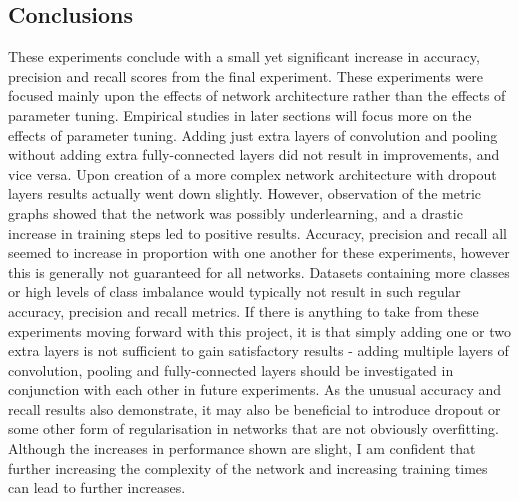 \documentclass[12pt]{report}
\begin{document}
\begin{flushleft}
\vspace{0.5cm}
\section{Conclusions}
These experiments conclude with a small yet significant increase in accuracy, precision and recall scores from the final experiment. These experiments were focused mainly upon the effects of network architecture rather than the effects of parameter tuning. Empirical studies in later sections will focus more on the effects of parameter tuning. Adding just extra layers of convolution and pooling without adding extra fully-connected layers did not result in improvements, and vice versa. Upon creation of a more complex network architecture with dropout layers results actually went down slightly. However, observation of the metric graphs showed that the network was possibly underlearning, and a drastic increase in training steps led to positive results. Accuracy, precision and recall all seemed to increase in proportion with one another for these experiments, however this is generally not guaranteed for all networks. Datasets containing more classes or high levels of class imbalance would typically not result in such regular accuracy, precision and recall metrics. If there is anything to take from these experiments moving forward with this project, it is that simply adding one or two extra layers is not sufficient to gain satisfactory results - adding multiple layers of convolution, pooling and fully-connected layers should be investigated in conjunction with each other in future experiments. As the unusual accuracy and recall results also demonstrate, it may also be beneficial to introduce dropout or some other form of regularisation in networks that are not obviously overfitting. Although the increases in performance shown are slight, I am confident that further increasing the complexity of the network and increasing training times can lead to further increases.
\end{flushleft}

\newpage
\end{document}
